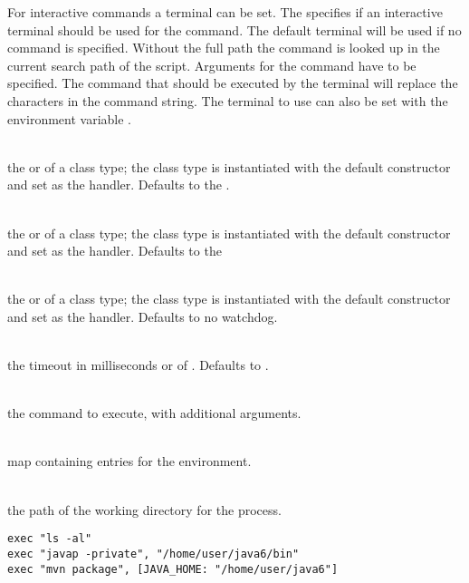 For interactive commands a terminal can be set. The  specifies
if an interactive terminal should be used for the command. The default terminal
will be used if no  command is specified. Without the full
path the command is looked up in the current search path of the
script. Arguments for the command have to be specified. The command that should
be executed by the terminal will replace the  characters in
the command string. The terminal to use can also be set with the environment
variable .

\begin{asparaitem}
%
\item[\code{handler: handler}] \hfill \\
the \cite{executeresulthandler13} or of a class 
type; the class type is instantiated with the default
constructor and set as the handler. Defaults to the 
\cite{defaultexecuteresulthandler13}.
%
\item[\code{destroyer: destroyer}] \hfill \\
the \cite{processdestroyer13} or of a class 
type; the class type is instantiated with the default
constructor and set as the handler.
Defaults to the \cite{shutdownhookprocessdestroyer13}
%
\item[\code{watchdog: watchdog}] \hfill \\
the \cite{executewatchdog13} or of a class 
type; the class type is instantiated with the default
constructor and set as the handler.
Defaults to no watchdog.
%
\item[\code{timeout: duration}] \hfill \\
the timeout in milliseconds or of \cite{duration13}.
Defaults to .
%
\item[\code{command}] \hfill \\
the command to execute, with additional arguments.
%
\item[\code{env}] \hfill \\
map containing  entries for the environment.
%
\item[\code{path}] \hfill \\
the path of the working directory for the process.
%
\end{asparaitem}

\begin{lstlisting}[style=Groovybash, label={lst:example_exec1}, title={
Examples to execute external commands.}]
exec "ls -al"
exec "javap -private", "/home/user/java6/bin"
exec "mvn package", [JAVA_HOME: "/home/user/java6"]
\end{lstlisting}

